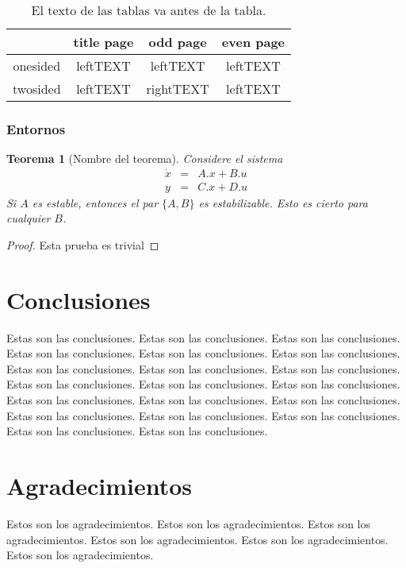 \documentclass[twocolumn]{maeb2015}
\newtheorem{theorem}{Teorema}
\begin{document}
\begin{table}[htb]
\caption{El texto de las tablas va antes de la tabla.}
\begin{center}
{\tt
\begin{tabular}{|c||c|c|c|}\hline
&title page&odd page&even page\\\hline\hline
onesided&leftTEXT&leftTEXT&leftTEXT\\\hline
twosided&leftTEXT&rightTEXT&leftTEXT\\\hline
\end{tabular}
}
\end{center}
\end{table}

\subsubsection{Entornos}
\begin{theorem}[Nombre del teorema]
Considere el sistema
\begin{equation}
\begin{array}{rrr}
\dot x&=&A.x+B.u\\[2mm]
y&=& C.x+D.u
\end{array}
\end{equation}
Si $A$ es estable, entonces el par $\{A,B\}$ es estabilizable.
Esto es cierto para cualquier $B$.
\end{theorem}

\begin{proof}
Esta prueba es trivial
\end{proof}

\section{Conclusiones}
Estas son las conclusiones.
Estas son las conclusiones.
Estas son las conclusiones.
Estas son las conclusiones.
Estas son las conclusiones.
Estas son las conclusiones.
Estas son las conclusiones.
Estas son las conclusiones.
Estas son las conclusiones.
Estas son las conclusiones.
Estas son las conclusiones.
Estas son las conclusiones.
Estas son las conclusiones.
Estas son las conclusiones.
Estas son las conclusiones.
Estas son las conclusiones.
Estas son las conclusiones.
Estas son las conclusiones.
Estas son las conclusiones.
Estas son las conclusiones.

\section*{Agradecimientos}
Estos son los agradecimientos.
Estos son los agradecimientos.
Estos son los agradecimientos.
Estos son los agradecimientos.
Estos son los agradecimientos.
Estos son los agradecimientos.
\end{document}
